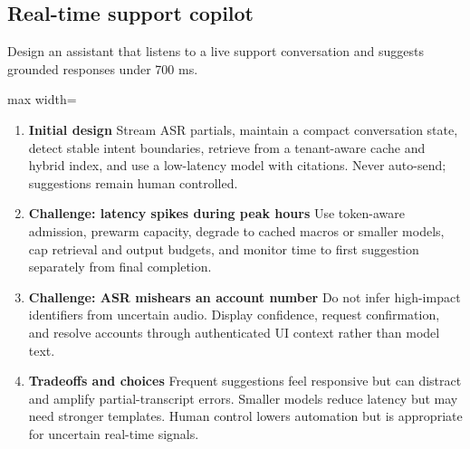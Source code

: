 \subsection{Real-time support copilot}
Design an assistant that listens to a live support conversation and suggests grounded responses under 700 ms.
\begin{center}\begin{adjustbox}{max width=\linewidth}\end{adjustbox}\end{center}
\begin{enumerate}
\item \textbf{Initial design} Stream ASR partials, maintain a compact conversation state, detect stable intent boundaries, retrieve from a tenant-aware cache and hybrid index, and use a low-latency model with citations. Never auto-send; suggestions remain human controlled.
\item \textbf{Challenge: latency spikes during peak hours} Use token-aware admission, prewarm capacity, degrade to cached macros or smaller models, cap retrieval and output budgets, and monitor time to first suggestion separately from final completion.
\item \textbf{Challenge: ASR mishears an account number} Do not infer high-impact identifiers from uncertain audio. Display confidence, request confirmation, and resolve accounts through authenticated UI context rather than model text.
\item \textbf{Tradeoffs and choices} Frequent suggestions feel responsive but can distract and amplify partial-transcript errors. Smaller models reduce latency but may need stronger templates. Human control lowers automation but is appropriate for uncertain real-time signals.
\end{enumerate}
